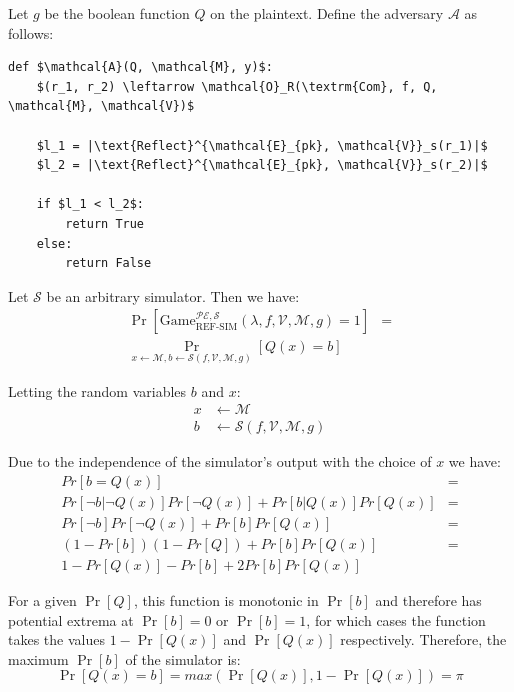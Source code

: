 \documentclass[conference, letterpaper, 10pt]{IEEEtran}
\begin{document}
\begin{IEEEproof}

Let $g$ be the boolean function $Q$ on the plaintext. Define the adversary
$\mathcal{A}$ as follows:

\begin{lstlisting}[texcl,mathescape,basicstyle=\small]
def $\mathcal{A}(Q, \mathcal{M}, y)$:
    $(r_1, r_2) \leftarrow \mathcal{O}_R(\textrm{Com}, f, Q, \mathcal{M}, \mathcal{V})$

    $l_1 = |\text{Reflect}^{\mathcal{E}_{pk}, \mathcal{V}}_s(r_1)|$
    $l_2 = |\text{Reflect}^{\mathcal{E}_{pk}, \mathcal{V}}_s(r_2)|$

    if $l_1 < l_2$:
        return True
    else:
        return False
\end{lstlisting}

Let $\mathcal{S}$ be an arbitrary simulator. Then we have:
\begin{align*}
    \Pr[\text{Game}_{\text{REF-SIM}}^{\mathcal{PE},\mathcal{S}}
        (\lambda, f, \mathcal{V}, \mathcal{M}, g) = 1] &=\\
    \Pr_{x \leftarrow \mathcal{M}, b \leftarrow \mathcal{S}(f, \mathcal{V}, \mathcal{M}, g)}
        [Q(x) = b]
\end{align*}

Letting the random variables $b$ and $x$:
\begin{align*}
    x &\leftarrow \mathcal{M}\\
    b &\leftarrow \mathcal{S}(f, \mathcal{V}, \mathcal{M}, g)
\end{align*}

Due to the independence of the simulator's output with the choice of $x$ we have:
\begin{align*}
    Pr[b = Q(x)] &=\\
    Pr[\lnot b|\lnot Q(x)]Pr[\lnot Q(x)] + Pr[b|Q(x)]Pr[Q(x)] &=\\
    Pr[\lnot b]Pr[\lnot Q(x)] + Pr[b]Pr[Q(x)] &=\\
    (1 - Pr[b])(1 - Pr[Q]) + Pr[b]Pr[Q(x)] &=\\
    1 - Pr[Q(x)] - Pr[b] + 2Pr[b]Pr[Q(x)]
\end{align*}

For a given $\Pr[Q]$, this function is monotonic in $\Pr[b]$ and therefore has
potential extrema at $\Pr[b] = 0$ or $\Pr[b] = 1$, for which cases the function
takes the values $1 - \Pr[Q(x)]$ and $\Pr[Q(x)]$ respectively. Therefore, the
maximum $\Pr[b]$ of the simulator is:
\begin{equation*}
    \Pr[Q(x) = b] = max(\Pr[Q(x)], 1 - \Pr[Q(x)]) = \pi
\end{equation*}


\end{IEEEproof}
\end{document}
